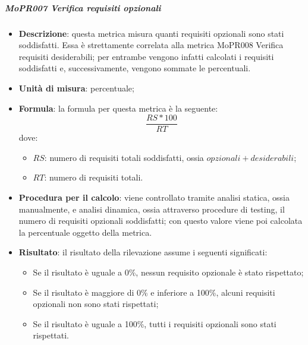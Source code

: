 \documentclass[../norme-di-progetto.tex]{subfiles}
\begin{document}
\subparagraph{MoPR007 Verifica requisiti opzionali}
\begin{itemize}
  \item \textbf{Descrizione}: questa metrica misura quanti requisiti opzionali sono stati soddisfatti. Essa è strettamente correlata alla metrica MoPR008 Verifica requisiti desiderabili; per entrambe vengono infatti calcolati i requisiti soddisfatti e, successivamente, vengono sommate le percentuali.
  \item \textbf{Unità di misura}: percentuale;
  \item \textbf{Formula}: la formula per questa metrica è la seguente:
  \begin{displaymath}
    \frac{RS * 100}{RT}
  \end{displaymath}
  dove:
  \begin{itemize}
    \item $ RS $: numero di requisiti totali soddisfatti, ossia $ opzionali + desiderabili $;
    \item $ RT $: numero di requisiti totali.
  \end{itemize}
    \item \textbf{Procedura per il calcolo}: viene controllato tramite analisi statica, ossia manualmente, e analisi dinamica, ossia attraverso procedure di testing, il numero di requisiti opzionali soddisfatti; con questo valore viene poi calcolata la percentuale oggetto della metrica.
    \item \textbf{Risultato}: il risultato della rilevazione assume i seguenti significati:
    \begin{itemize}
      \item Se il risultato è uguale a 0\%, nessun requisito opzionale è stato rispettato;
      \item Se il risultato è maggiore di 0\% e inferiore a 100\%, alcuni requisiti opzionali non sono stati rispettati;
      \item Se il risultato è uguale a 100\%, tutti i requisiti opzionali sono stati rispettati.
    \end{itemize}
\end{itemize}
\end{document}

